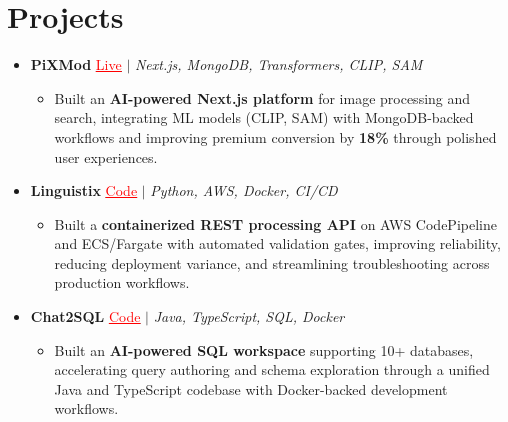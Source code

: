 \documentclass[letterpaper,10pt]{article}
\newcommand{\resumeItem}[1]{\item\small{{#1 \vspace{-2pt}}}}
\newcommand{\resumeProjectHeading}[1]{\item \small #1 \vspace{-2pt}}
\newcommand{\resumeSubHeadingListStart}{\begin{itemize}[leftmargin=0.0in, label={}]}
\newcommand{\resumeSubHeadingListEnd}{\end{itemize}}
\newcommand{\resumeProjItemListStart}{\begin{itemize}[leftmargin=0.15in,label=\textbullet,itemsep=0pt,topsep=0pt,parsep=0pt,partopsep=0pt]}
\newcommand{\resumeProjItemListEnd}{\end{itemize}\vspace{-4pt}}
\begin{document}
\section{Projects}
\resumeSubHeadingListStart
\vspace{-2pt}
\resumeProjectHeading{\textbf{PiXMod} {\href{https://pixmod.vercel.app/}{\textcolor{red}{\underline{Live}}}} $|$ \emph{Next.js, MongoDB, Transformers, CLIP, SAM}}
\resumeProjItemListStart
\resumeItem{Built an \textbf{AI-powered Next.js platform} for image processing and search, integrating ML models (CLIP, SAM) with MongoDB-backed workflows and improving premium conversion by \textbf{18\%} through polished user experiences.}
\resumeProjItemListEnd
\vspace{3pt}
\resumeProjectHeading{\textbf{Linguistix} {\href{https://github.com/SAHAJ-BHADJA/Linguistix}{\textcolor{red}{\underline{Code}}}} $|$ \emph{Python, AWS, Docker, CI/CD}}
\resumeProjItemListStart
\resumeItem{Built a \textbf{containerized REST processing API} on AWS CodePipeline and ECS/Fargate with automated validation gates, improving reliability, reducing deployment variance, and streamlining troubleshooting across production workflows.}
\resumeProjItemListEnd
\vspace{3pt}
\resumeProjectHeading{\textbf{Chat2SQL} {\href{https://github.com/SAHAJ-BHADJA/Chat2SQL}{\textcolor{red}{\underline{Code}}}} $|$ \emph{Java, TypeScript, SQL, Docker}}
\resumeProjItemListStart
\resumeItem{Built an \textbf{AI-powered SQL workspace} supporting 10+ databases, accelerating query authoring and schema exploration through a unified Java and TypeScript codebase with Docker-backed development workflows.}
\resumeProjItemListEnd
\resumeSubHeadingListEnd
\end{document}
